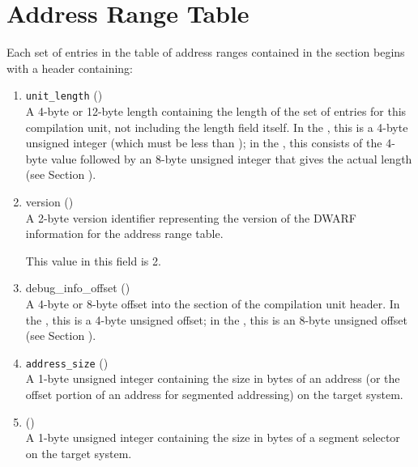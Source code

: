 \section{Address Range Table}
\label{datarep:addrssrangetable}

Each set of entries in the table of address ranges contained
in the \dotdebugaranges{}
section begins with a header containing:
\begin{enumerate}[1. ]

\item \texttt{unit\_length} () \\
A 4-byte or 12-byte length containing the length of the
set of entries for this compilation unit, not including the
length field itself. In the \thirtytwobitdwarfformat, this is a
4-byte unsigned integer (which must be less than \xfffffffzero);
in the \sixtyfourbitdwarfformat, this consists of the 4-byte value
\wffffffff followed by an 8-byte unsigned integer that gives
the actual length 
(see Section ).

\item version (\HFTuhalf) \\
A 2-byte version identifier representing the version of the
DWARF information for the address range table.

This value in this field  is 2. 
 
\item debug\_info\_offset () \\
A 
4-byte or 8-byte offset into the 
\dotdebuginfo{} section of
the compilation unit header. In the \thirtytwobitdwarfformat,
this is a 4-byte unsigned offset; in the \sixtyfourbitdwarfformat,
this is an 8-byte unsigned offset 
(see Section ).

\item \texttt{address\_size} (\HFTubyte) \\
A 1-byte unsigned integer containing the size in bytes of an
address 
(or the offset portion of an address for segmented
addressing) on the target system.

\item \HFNsegmentselectorsize{} (\HFTubyte) \\
A 1-byte unsigned integer containing the size in bytes of a
segment selector on the target system.

\end{enumerate}

